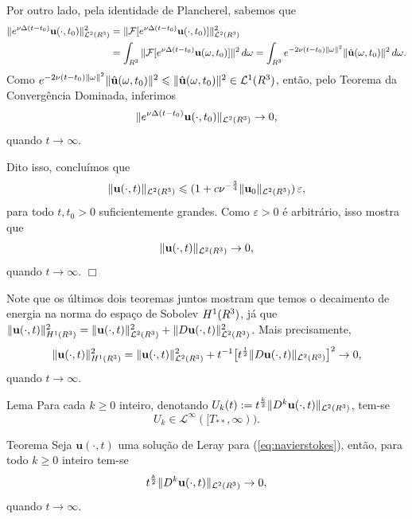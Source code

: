 \documentclass[xcolor=dvipsnames, aspectratio=169, 10pt]{beamer}
\let\mathbb\relax
\newcommand{\bR}{\mathbb{R}}
\newcommand{\bu}{\mathbf{u}}
\newcommand{\cF}{\mathcal{F}}
\newcommand{\cL}{\mathcal{L}}
\begin{document}
\begin{frame}
    Por outro lado, pela identidade de Plancherel, sabemos que
    \[
        \begin{aligned}
            \Vert e^{\nu \Delta (t-t_0)} \bu(\cdot,t_0) \Vert_{\cL^2(\bR^3)}^2 &= \Vert \cF [ e^{\nu \Delta (t-t_0) }\bu(\cdot,t_0)] \Vert_{\cL^2(\bR^3)}^2\\ &= \int_{\bR^3} \Vert \cF[ e^{\nu \Delta (t-t_0)} \bu(\omega,t_0)]\Vert^2 \,d\omega = \int_{\bR^3} e^{-2\nu (t-t_0) \Vert \omega \Vert^2} \Vert \hat{\bu} (\omega,t_0) \Vert^2 \,d\omega.
        \end{aligned}
    \]
    Como $e^{-2\nu (t-t_0) \Vert \omega \Vert^2} \Vert \hat{\bu}(\omega,t_0) \Vert^2 \leqslant \Vert \hat{\bu}(\omega,t_0) \Vert^2 \in \cL^1(\bR^3)$, então, pelo Teorema da Convergência Dominada, inferimos
    \[
        \Vert e^{\nu \Delta (t-t_0)} \bu(\cdot,t_0) \Vert_{\cL^2(\bR^3)} \to 0,
    \]
    quando $t \to \infty$.
\end{frame}
\begin{frame}
    Dito isso, concluímos que
    \[
        \Vert \bu(\cdot,t) \Vert_{\cL^2(\bR^3)} \leqslant (1 + c \nu^{-\frac{3}{4}} \Vert \bu_0 \Vert_{\cL^2(\bR^3)}) \,\varepsilon,
    \]
    para todo $t,t_0 > 0$ suficientemente grandes.
    Como $\varepsilon > 0$ é arbitrário, isso mostra que
    \[
        \Vert \bu(\cdot,t) \Vert_{\cL^2(\bR^3)} \to 0,
    \]
    quando $t \to \infty$. \hfill $\Box$
\end{frame}
\begin{frame}
    Note que os últimos dois teoremas juntos mostram que temos o decaimento de energia na norma do espaço de Sobolev $H^1(\bR^3)$, já que $\Vert \bu(\cdot,t) \Vert_{H^1(\bR^3)}^2 = \Vert \bu(\cdot,t) \Vert_{\cL^2(\bR^3)}^2 + \Vert D\bu(\cdot,t) \Vert_{\cL^2(\bR^3)}^2$. Mais precisamente,
\[
    \Vert \bu(\cdot,t) \Vert_{H^1(\bR^3)}^2 = \Vert \bu(\cdot,t) \Vert_{\cL^2(\bR^3)}^2 + t^{-1} \big[ t^{\frac{1}{2}} \Vert D\bu(\cdot,t) \Vert_{\cL^2(\bR^3)}\big]^2 \to 0,
\]
quando $t \to \infty$.
\end{frame}
\begin{frame}
    \begin{block}{Lema}
        Para cada $k \geqslant 0$ inteiro, denotando $U_k(t) := t^{\frac{k}{2}} \Vert D^k \bu(\cdot,t) \Vert_{\cL^2(\bR^3)}$, tem-se
    \[
        U_k \in \cL^\infty([T_{**}, \infty)).
    \]
    \end{block}

    \begin{block}{Teorema}
        Seja $\bu(\cdot,t)$ uma solução de Leray para (\ref{eq:navierstokes}), então, para todo $k \geqslant 0$ inteiro tem-se
    \[
        t^{\frac{k}{2}} \Vert D^k\bu(\cdot,t) \Vert_{\cL^2(\bR^3)} \to 0,
    \]
    quando $t \to \infty$.
    \end{block}
\end{frame}
\end{document}
